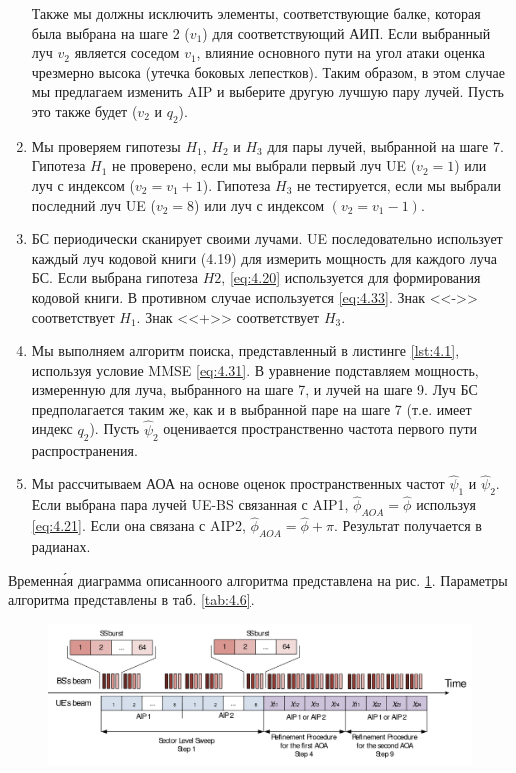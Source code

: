 \begin{enumerate}[label=\textbf{Шаг \arabic*:}]
          Также мы должны исключить элементы, соответствующие балке, которая была
          выбрана на шаге 2 ($v_1$) для соответствующий АИП. Если выбранный луч
          $v_2$
          является соседом $v_1$, влияние основного пути на угол атаки оценка
          чрезмерно высока (утечка боковых лепестков). Таким образом, в этом
          случае мы предлагаем изменить AIP и выберите другую лучшую пару лучей.
          Пусть это также будет ($v_2$ и $q_2$).
    \item Мы проверяем гипотезы $H_1$, $H_2$ и $H_3$ для пары лучей, выбранной
          на шаге 7. Гипотеза $H_1$ не проверено, если мы выбрали первый луч UE ($v_2
              = 1$) или луч с индексом ($v_2 = v_1+1$). Гипотеза $H_3$ не тестируется,
          если мы выбрали последний луч UE ($v_2 = 8$) или луч с индексом
          $(v_2 = v_1-1)$.
    \item БС периодически сканирует своими лучами. UE последовательно использует каждый луч кодовой книги (4.19) для
          измерить мощность для каждого луча БС. Если выбрана гипотеза $H2$,
          \eqref{eq:4.20} используется для формирования кодовой книги.
          В противном случае используется \eqref{eq:4.33}.
          Знак <<->> соответствует $H_1$. Знак <<+>> соответствует $H_3$.
    \item Мы выполняем алгоритм поиска, представленный в листинге \ref{lst:4.1},
          используя условие MMSE \eqref{eq:4.31}. В уравнение подставляем мощность,
          измеренную для луча, выбранного на шаге 7, и лучей на шаге 9. Луч БС
          предполагается таким же, как и в выбранной паре на шаге 7 (т.е. имеет индекс
          $q_2$). Пусть $\hat \psi_2$ оценивается пространственно частота первого пути
          распространения.
    \item Мы рассчитываем АОА на основе оценок пространственных частот $\hat \psi_1$ и
          $\hat \psi_2$. Если выбрана пара лучей UE-BS связанная с AIP1, $\hat \phi_{AOA}=\hat \phi$
          используя \eqref{eq:4.21}.
          Если она связана с AIP2, $\hat \phi_{AOA} = \hat\phi + \pi$. Результат
          получается в радианах.
\end{enumerate}

Временн\'{а}я диаграмма описанноого алгоритма представлена на рис. \ref{fig:4.25}.
Параметры алгоритма представлены в таб. \ref{tab:4.6}.

\begin{figure}[h!]
    \centering
    \includegraphics[width=\linewidth]{figs/fig4.25}
    \caption{}
    \label{fig:4.25}
\end{figure}

